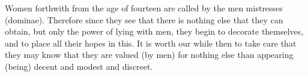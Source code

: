 Women  forthwith from  the age  of fourteen  are called  by the  men mistresses
(dominae). Therefore  since they see that  there is nothing else  that they can
obtain,  but  only  the  power  of  lying with  men,  they  begin  to  decorate
themselves, and to place all their hopes in this. It is worth our while then to
take care  that they may know  that they are  valued (by men) for  nothing else
than appearing (being) decent and modest and discreet.
